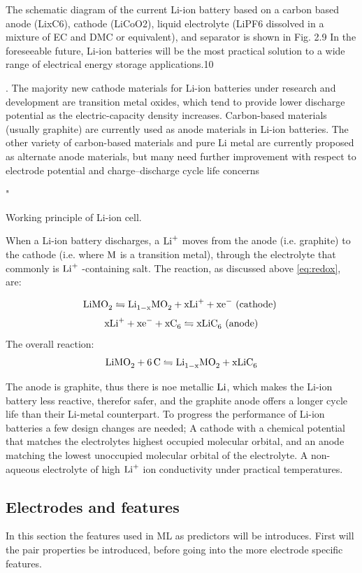The schematic diagram of the current Li-ion battery based on
a carbon based anode (LixC6), cathode (LiCoO2), liquid electrolyte (LiPF6 dissolved in a mixture of EC and DMC or equivalent),
and separator is shown in Fig. 2.9 In the foreseeable future,
Li-ion batteries will be the most practical solution to a wide
range of electrical energy storage applications.10


. The majority new cathode
materials for Li-ion batteries under research and development
are transition metal oxides, which tend to provide lower discharge
potential as the electric-capacity density increases. Carbon-based
materials (usually graphite) are currently used as anode materials
in Li-ion batteries. The other variety of carbon-based materials and
pure Li metal are currently proposed as alternate anode materials,
but many need further improvement with respect to electrode
potential and charge–discharge cycle life concerns

"\cite{bhatt2015recent}

Working principle of Li-ion cell. 

When a Li-ion battery discharges, a $\ce{Li^+}$ moves from the anode (i.e. graphite) to the cathode (i.e.  where $\ce{M}$ is a transition metal), through the electrolyte that commonly is  $\ce{Li^+}$ -containing salt. The reaction, as discussed above \ref{eq:redox}, are:


$$\ce{LiMO_2} \leftrightharpoons   \ce{Li_{1-x}MO_2} + \ce{xLi^+} + \ce {xe^-}\text{ (cathode)} $$
$$\ce{xLi+} + \ce{xe^-} + \ce{xC_6} \leftrightharpoons  \ce{xLiC_6} \text{ (anode)} $$
The overall reaction:
$$\ce{LiMO_2} + \ce{6C} \leftrightharpoons  \ce{Li_{1-x}MO_2} +  \ce{xLiC_6}$$

The anode is graphite, thus there is noe metallic $\ce{Li}$, which makes the Li-ion battery less reactive, therefor safer, and the graphite anode offers a longer cycle life than their Li-metal counterpart. To progress the performance of Li-ion batteries a few design changes are needed; A cathode with a chemical potential that matches the electrolytes highest occupied molecular orbital, and an anode matching the lowest unoccupied molecular orbital of the electrolyte. A non-aqueous electrolyte of high $\ce{Li^+} $ ion conductivity under practical temperatures. 


\subsection{Electrodes and features}
	In this section the features used in ML as predictors will be introduces. First will the pair properties be introduced, before going into the more electrode specific features. 


